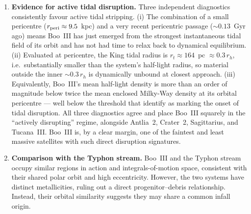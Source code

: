 \documentclass[twocolumn]{aastex631}
\begin{document}
\begin{enumerate}[leftmargin=*]
\item \textbf{Evidence for active tidal disruption.} Three independent diagnostics consistently favour active tidal stripping. (i) The combination of a small pericentre ($r_{\rm peri} \approx 9.5$~kpc) and a very recent pericentric passage ($\sim 0.13$~Gyr ago) means Boo~III has just emerged from the strongest instantaneous tidal field of its orbit and has not had time to relax back to dynamical equilibrium. (ii) Evaluated at pericentre, the King tidal radius is $r_t \approx 164$~pc $\approx 0.3\,r_h$, i.e.\ substantially smaller than the system's half-light radius, so material outside the inner $\sim 0.3\,r_h$ is dynamically unbound at closest approach. (iii) Equivalently, Boo~III's mean half-light density is more than an order of magnitude below twice the mean enclosed Milky-Way density at its orbital pericentre --- well below the threshold that \citet{Pace2022} identify as marking the onset of tidal disruption. All three diagnostics agree and place Boo~III squarely in the ``actively disrupting'' regime, alongside Antlia~2, Crater~2, Sagittarius, and Tucana~III. Boo~III is, by a clear margin, one of the faintest and least massive satellites with such direct disruption signatures.

\item \textbf{Comparison with the Typhon stream.} Boo~III and the Typhon stream occupy similar regions in action and integrals-of-motion space, consistent with their shared polar orbit and high eccentricity. However, the two systems have distinct metallicities, ruling out a direct progenitor--debris relationship. Instead, their orbital similarity suggests they may share a common infall origin.


\end{enumerate}
\end{document}
